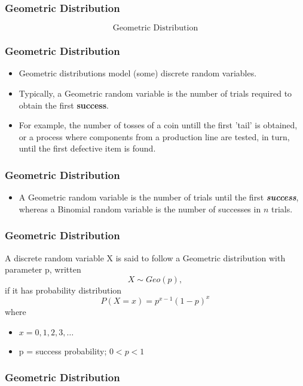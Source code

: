 \documentclass[IntroMain.tex]{subfiles}
\begin{document}
	\begin{frame}
		\frametitle{Geometric Distribution}
		\Large
		\[	\mbox{Geometric Distribution}\]
	\end{frame}
\begin{frame}
	\frametitle{Geometric Distribution}
	\Large
	\begin{itemize}
		
		\item Geometric distributions model (some) discrete random variables.
		\item  Typically, a Geometric random variable is the number of trials required to obtain the first \textbf{success}.
		\item For example, the number of tosses of a coin untill the first 'tail' is obtained, or a process where components from a production line are tested, in turn, until the first defective item is found.
		
	\end{itemize}
\end{frame}
\begin{frame}
	\frametitle{Geometric Distribution}
	\Large
	\begin{itemize}
		\item A Geometric random variable is the number of trials until the first \textit{\textbf{success}}, whereas a Binomial random variable is the number of successes in $n$ trials.
	\end{itemize}
\end{frame}
\begin{frame}
	\frametitle{Geometric Distribution}
	\Large
	A discrete random variable X is said to follow a Geometric distribution with parameter p, written \[X \sim Geo(p),\] if it has probability distribution
	\[P(X=x) = p^{x-1}(1-p)^x\]
	where
	\begin{itemize}
		\item $x = 0, 1, 2, 3, \ldots$
		\item p = success probability; $0 < p < 1$
	\end{itemize}
	
\end{frame}
\begin{frame}
	\frametitle{Geometric Distribution}
	
\end{frame}
\end{document}
